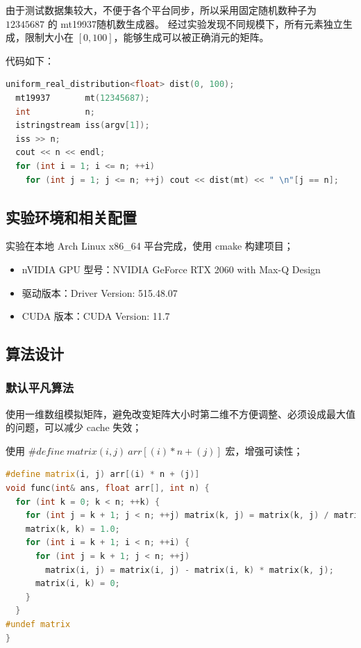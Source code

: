 \documentclass[a4paper]{article}
\begin{document}
由于测试数据集较大，不便于各个平台同步，所以采用固定随机数种子为 $12345687$ 的 mt19937随机数生成器。
经过实验发现不同规模下，所有元素独立生成，限制大小在 $[0, 100]$，能够生成可以被正确消元的矩阵。

代码如下：

\begin{lstlisting}[title=测试数据集生成器,frame=trbl,language={C++}]
  uniform_real_distribution<float> dist(0, 100);
  mt19937       mt(12345687);
  int           n;
  istringstream iss(argv[1]);
  iss >> n;
  cout << n << endl;
  for (int i = 1; i <= n; ++i)
    for (int j = 1; j <= n; ++j) cout << dist(mt) << " \n"[j == n];
\end{lstlisting}

\subsection{实验环境和相关配置}

实验在本地 Arch Linux x86\_64 平台完成，使用 cmake 构建项目；

\begin{itemize}
  \item nVIDIA GPU 型号：NVIDIA GeForce RTX 2060 with Max-Q Design
  \item 驱动版本：Driver Version: 515.48.07
  \item CUDA 版本：CUDA Version: 11.7
\end{itemize}

\subsection{算法设计}

\subsubsection{默认平凡算法}

使用一维数组模拟矩阵，避免改变矩阵大小时第二维不方便调整、必须设成最大值的问题，可以减少 cache 失效；

使用 $\#define\ matrix(i, j)\ arr[(i) * n + (j)]$ 宏，增强可读性；

\begin{lstlisting}[title=平凡算法,frame=trbl,language={C++}]
#define matrix(i, j) arr[(i) * n + (j)]
void func(int& ans, float arr[], int n) {
  for (int k = 0; k < n; ++k) {
    for (int j = k + 1; j < n; ++j) matrix(k, j) = matrix(k, j) / matrix(k, k);
    matrix(k, k) = 1.0;
    for (int i = k + 1; i < n; ++i) {
      for (int j = k + 1; j < n; ++j)
        matrix(i, j) = matrix(i, j) - matrix(i, k) * matrix(k, j);
      matrix(i, k) = 0;
    }
  }
#undef matrix
}
\end{lstlisting}




% 
% 
\end{document}
